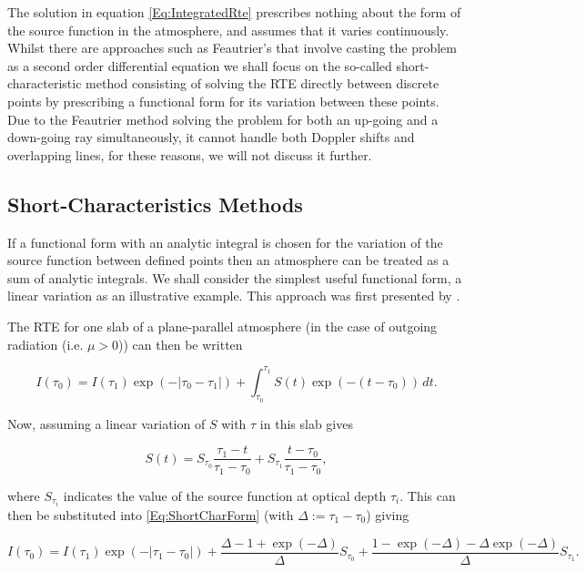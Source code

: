 The solution in equation \ref{Eq:IntegratedRte} prescribes nothing about the form of the source function in the atmosphere, and assumes that it varies continuously.
Whilst there are approaches such as Feautrier's \citep{Feautrier1964} that involve casting the problem as a second order differential equation we shall focus on the so-called short-characteristic method consisting of solving the RTE directly between discrete points by prescribing a functional form for its variation between these points. Due to the Feautrier method solving the problem for both an up-going and a down-going ray simultaneously, it cannot handle both Doppler shifts and overlapping lines, for these reasons, we will not discuss it further.

\subsection{Short-Characteristics Methods}\label{Sec:ShortChar}

If a functional form with an analytic integral is chosen for the variation of the source function between defined points then an atmosphere can be treated as a sum of analytic integrals. We shall consider the simplest useful functional form, a linear variation as an illustrative example.
This approach was first presented by \citet{Olson1987}.

The RTE for one slab of a plane-parallel atmosphere (in the case of outgoing radiation (i.e. $\mu > 0$)) can then be written

\begin{equation}
    I(\tau_0) = I(\tau_1) \exp(- |\tau_0 - \tau_1|) + \int_{\tau_0}^{\tau_1} S(t) \exp(-(t - \tau_0))\, dt.
    \label{Eq:ShortCharForm}
\end{equation}

Now, assuming a linear variation of $S$ with $\tau$ in this slab gives

\begin{equation}
    S(t) = S_{\tau_0} \frac{\tau_1-t}{\tau_1-\tau_0} + S_{\tau_1} \frac{t-\tau_0}{\tau_1-\tau_0},
\end{equation}

where $S_{\tau_i}$ indicates the value of the source function at optical depth $\tau_i$.
This can then be substituted into \eqref{Eq:ShortCharForm} (with $\Delta := \tau_1 - \tau_0$) giving

\begin{equation}
    I(\tau_0) = I(\tau_1) \exp(- |\tau_1 - \tau_0|) +
    \frac{\Delta - 1 + \exp(-\Delta)}{\Delta} S_{\tau_0} +
    \frac{1 - \exp(-\Delta) - \Delta\exp(-\Delta)}{\Delta} S_{\tau_1}.
\end{equation}

